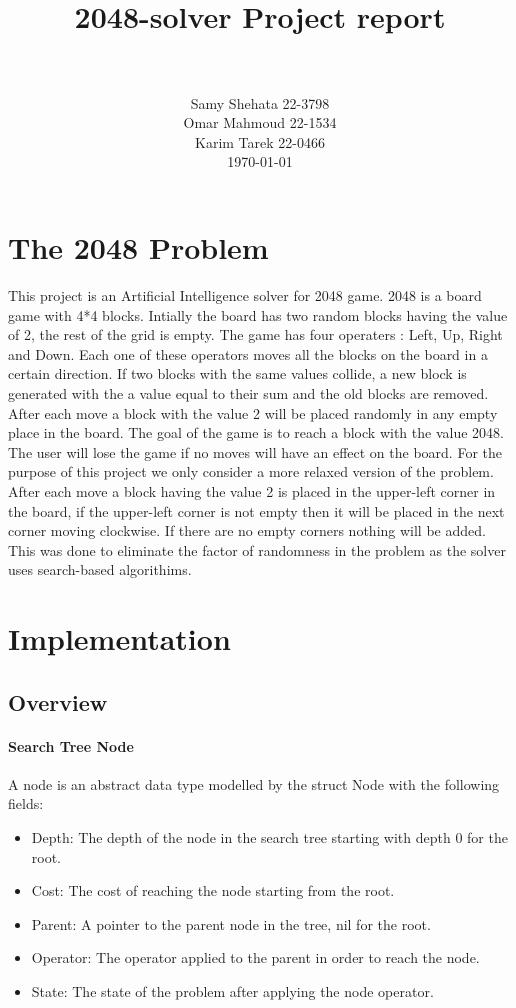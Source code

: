 \documentclass[paper=a4, fontsize=11pt]{scrartcl}
\title{
		\usefont{OT1}{bch}{b}{n}
		\normalfont \normalsize \textsc{} \\ [25pt]
		\horrule{0.5pt} \\[0.4cm]
		\huge 2048-solver Project report \\
		\horrule{2pt} \\[0.5cm]
}
\author{
		\normalfont 								\normalsize
        Samy Shehata 22-3798\\[-3pt]		\normalsize
        Omar Mahmoud 22-1534\\[-3pt]		\normalsize
        Karim Tarek 22-0466\\[-3pt]		\normalsize
        \today
}
\date{}
\numberwithin{equation}{section}		%
\numberwithin{figure}{section}			%
\numberwithin{table}{section}				%
\begin{document}
\maketitle
\section{The 2048 Problem}
This project is an Artificial Intelligence solver for 2048 game. 2048 is a board game with 4*4 blocks. Intially the  board has two random blocks having the value of 2, the rest of the grid is empty. The game has four operaters : Left, Up, Right and Down. Each one of these operators moves all the blocks on the board in a certain direction. If two blocks with the same values collide, a new block is generated with the a value equal to their sum and the old blocks are removed. After each move a block with the value 2 will be placed randomly in any empty place in the board. The goal of the game is to reach a block with the value 2048. The user will lose the game if no moves will have an effect on the board. For the purpose of this project we only consider a more relaxed version of the problem. After each move a block having the value 2 is placed in the upper-left corner in the board, if the upper-left corner is not empty then it will be placed in the next corner moving clockwise. If there are no empty corners nothing will be added. This was done to eliminate the factor of randomness in the problem as the solver uses search-based algorithims. 

\section{Implementation}
\subsection{Overview}

\paragraph{Search Tree Node}
A node is an abstract data type modelled by the struct Node with the following fields:
\begin{itemize}
	\item{Depth:} The depth of the node in the search tree starting with depth 0 for the root.
    \item{Cost:} The cost of reaching the node starting from the root.
	\item{Parent:} A pointer to the parent node in the tree, nil for the root.	
	\item{Operator:} The operator applied to the parent in order to reach the node.
	\item{State:} The state of the problem after applying the node operator.
\end{itemize}
\end{document}
